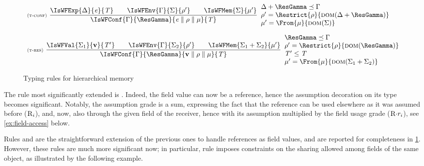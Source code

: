 \begin{figure}
\begin{math}
\begin{array}{l}
\NamedRule{t-conf}
{
\IsWFExp{\Delta}{\e}{\T}\BigSpace
\IsWFEnv{\Gamma}{\Sigma}{\env'}\BigSpace
\IsWFMem{\Sigma}{\mem'}
}
{
\IsWFConf{\Gamma}{\ResGamma}{\Conf{\e}{\env}{\mem}}{\T}
}
{
\Delta\ctxsum\ResGamma\ctxord\Gamma\\
\env'=\Restrict{\env}{\dom{\Delta\ctxsum\ResGamma}}\\
\mem'=\From{\mem}{\dom{\Sigma}}
}

\\[5ex]

\NamedRule{t-res}
{
\IsWFVal{\Sigma_1}{\val}{\T'}\BigSpace
\IsWFEnv{\Gamma}{\Sigma_2}{\env'}\BigSpace
\IsWFMem{\Sigma_1\ctxsum\Sigma_2}{\mem'}
}
{
\IsWFConf{\Gamma}{\ResGamma}{\Conf{\val}{\env}{\mem}}{\T}
}
{
\ResGamma\ctxord\Gamma\\
\env'=\Restrict{\env}{\dom{\ResGamma}}\\
\T'\subt\T\\
\mem'=\From{\mem}{\dom{\Sigma_1\ctxsum\Sigma_2}}
}

\end{array}
\end{math}
\caption{Typing rules for hierarchical memory}
\label{fig:typing-hierarchical} 
\end{figure}

The rule most significantly extended is . Indeed, the field value can now be a reference, hence the assumption decoration on its type becomes significant. Notably, the assumption grade is a sum, expressing the fact that the reference can be used elsewhere as it was assumed before ($\textsc{R}_i$), and, now, also through  the given field of the receiver, hence with its assumption multiplied by the field usage grade ($\textsc{R}{\cdot}r_i$), see \cref{ex:field-access} below.

Rules  and  are the straightforward extension of the previous ones to handle references as field values, and are reported for completeness in \cref{fig:typing-hierarchical}.
However, these rules are much more significant now; in particular, rule  imposes constraints on the sharing allowed among fields of the same object, \bez
as illustrated by the following example.

